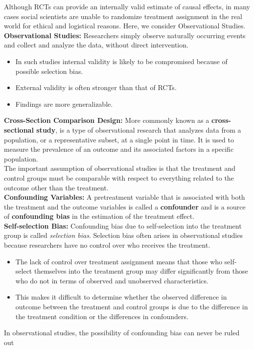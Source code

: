 \documentclass{article}
\begin{document}
    \noindent Although RCTs can provide an internally valid estimate of
causal effects, in many cases social scientists are unable to randomize
treatment assignment in the real world for ethical and logistical reasons.
Here, we consider Observational Studies.\\

    \noindent \textbf{Observational Studies:} Researchers simply observe
naturally occurring events and collect and analyze the data, without direct
intervention.
    \begin{itemize}
        \item In such studies internal validity is likely to be compromised
        because of possible selection bias.
        \item External validity is often stronger than that of RCTs.
        \item Findings are more generalizable.
    \end{itemize}

    \noindent \textbf{Cross-Section Comparison Design:} More commonly known
as a \textbf{cross-sectional study}, is a type of observational research
that analyzes data from a population, or a representative subset, at a
single point in time. It is used to measure the prevalence of an outcome and
its associated factors in a specific population.\\

    \noindent The important assumption of observational studies is that the
treatment and control groups must be comparable with respect to everything
related to the outcome other than the treatment.\\

    \noindent \textbf{Confounding Variables:} A pretreatment variable that
is associated with both the treatment and the outcome variables is called a \textbf{confounder} and is a source of \textbf{confounding bias} in the estimation of the treatment effect.\\

    \noindent \textbf{Self-selection Bias:} Confounding bias due to
self-selection into the treatment group is called \textit{selection bias}.
Selection bias often arises in observational studies because researchers
have no control over who receives the treatment.
    \begin{itemize}
        \item The lack of control over treatment assignment means that those
        who self-select themselves into the treatment group may differ
        significantly from those who do not in terms of observed and
        unobserved characteristics.
        \item This makes it difficult to determine whether the observed
        difference in outcome between the treatment and control groups is
        due to the difference in the treatment condition or the differences
        in confounders.
    \end{itemize}

    \noindent In observational studies, the possibility of confounding bias
can never be ruled out
\end{document}
